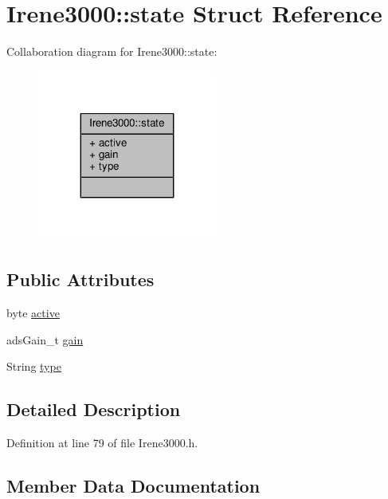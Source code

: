 \hypertarget{structIrene3000_1_1state}{}\section{Irene3000\+:\+:state Struct Reference}
\label{structIrene3000_1_1state}


Collaboration diagram for Irene3000\+:\+:state\+:\nopagebreak
\begin{figure}[H]
\begin{center}
\leavevmode
\includegraphics[width=167pt]{structIrene3000_1_1state__coll__graph}
\end{center}
\end{figure}
\subsection*{Public Attributes}
\begin{DoxyCompactItemize}
\item 
byte \hyperlink{structIrene3000_1_1state_af7ff649f20b9a2fb6ca0f949ee9a25ce}{active}
\item 
ads\+Gain\+\_\+t \hyperlink{structIrene3000_1_1state_a1ecf69d38cb31ecaf6b3602a3f3e93cb}{gain}
\item 
String \hyperlink{structIrene3000_1_1state_a9897a7e02727db6351d44006eec73799}{type}
\end{DoxyCompactItemize}


\subsection{Detailed Description}


Definition at line 79 of file Irene3000.\+h.



\subsection{Member Data Documentation}
\mbox{\label{structIrene3000_1_1state_af7ff649f20b9a2fb6ca0f949ee9a25ce}} 
